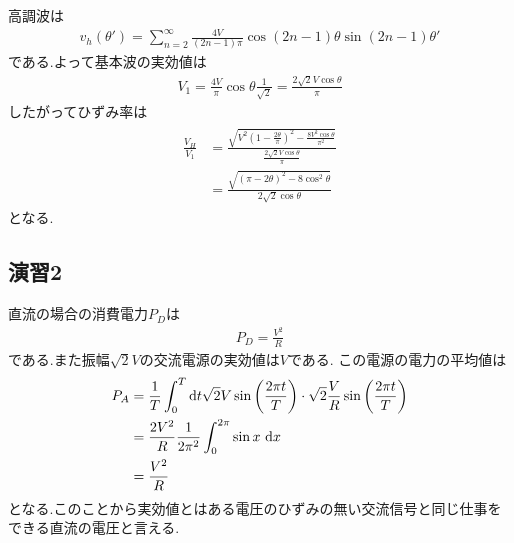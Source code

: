 \documentclass[uplatex,a4j,11pt,dvipdfmx]{jsarticle}
\begin{document}
高調波は
\begin{align}
  v_h(\theta')=\sum_{n=2}^{\infty} \frac{4V}{(2n-1)\pi}\cos(2n-1)\theta\sin(2n-1)\theta'
\end{align}
である.よって基本波の実効値は
\begin{align}
  V_1=\frac{4V}{\pi}\cos\theta\frac{1}{\sqrt{2}}=\frac{2\sqrt{2}V\cos\theta}{\pi}
\end{align}
したがってひずみ率は
\begin{align}
  \begin{split}
    \frac{V_H}{V_1}&=\frac{\sqrt{V^2\left(1-\frac{2\theta}{\pi}\right)^2-\frac{8V^2\cos\theta}{\pi^2}}}{\frac{2\sqrt{2}V\cos\theta}{\pi}}\\
    &=\frac{\sqrt{(\pi-2\theta)^2-8\cos^2\theta}}{2\sqrt{2}\cos\theta}    
  \end{split}
\end{align}
となる.
\subsection*{演習2}
直流の場合の消費電力$P_D$は
\begin{align}
  P_D=\frac{V^2}{R}
\end{align}
である.また振幅$\sqrt{2}V$の交流電源の実効値は$V$である.
この電源の電力の平均値は
\begin{align}
  P_A&=\frac{1}{T}\int_0^T{\rm d}t\sqrt{2}V\sin\left(\frac{2\pi t}{T}\right)\cdot\sqrt{2}\frac{V}{R}\sin\left(\frac{2\pi t}{T}\right)\\
  &=\frac{2V^2}{R}\frac{1}{2\pi^2}\int_0^{2\pi}\sin x\ {\rm d}x\\
  &=\frac{V^2}{R}
\end{align}
となる.このことから実効値とはある電圧のひずみの無い交流信号と同じ仕事をできる直流の電圧と言える.
\end{document}

